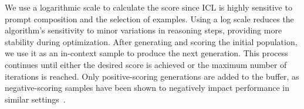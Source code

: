 We use a logarithmic scale to calculate the score since ICL is highly sensitive to prompt composition and the selection of examples. Using a log scale reduces the algorithm's sensitivity to minor variations in reasoning steps, providing more stability during optimization. After generating and scoring the initial population, we use it as an in-context sample to produce the next generation. This process continues until either the desired score is achieved or the maximum number of iterations is reached. Only positive-scoring generations are added to the buffer, as negative-scoring samples have been shown to negatively impact performance in similar settings~\cite{monea2024llms}. 


















